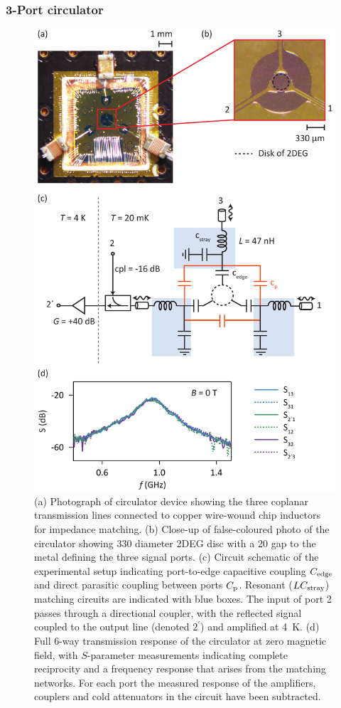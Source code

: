 \subsubsection{3-Port circulator}
\begin{figure}
\includegraphics[width=0.7\columnwidth]{fig2_QH}
\caption[Experimental setup for determining the response of the on-chip circulator]{\label{FIG. 2.}
(a) Photograph of circulator device showing the three coplanar transmission lines connected to copper wire-wound chip inductors for impedance matching.
(b) Close-up of false-coloured photo of the circulator showing \SI{330}{\micron} diameter 2DEG disc with a \SI{20}{\micron} gap to the metal defining the three signal ports.
(c) Circuit schematic of the experimental setup indicating port-to-edge capacitive coupling $C_{\rm edge}$ and direct parasitic coupling between ports $C_{\rm p}$. Resonant ($LC_{\rm stray}$) matching circuits are indicated with blue boxes. The input of port 2 passes through a directional coupler, with the reflected signal coupled to the output line (denoted $2^\prime$) and amplified at \SI{4}{\kelvin}.
(d) Full 6-way transmission response of the circulator at zero magnetic field, with $S$-parameter measurements indicating complete reciprocity and a frequency response that arises from the matching networks. For each port the measured response of the amplifiers, couplers and cold attenuators in the circuit have been subtracted.}
\end{figure}

